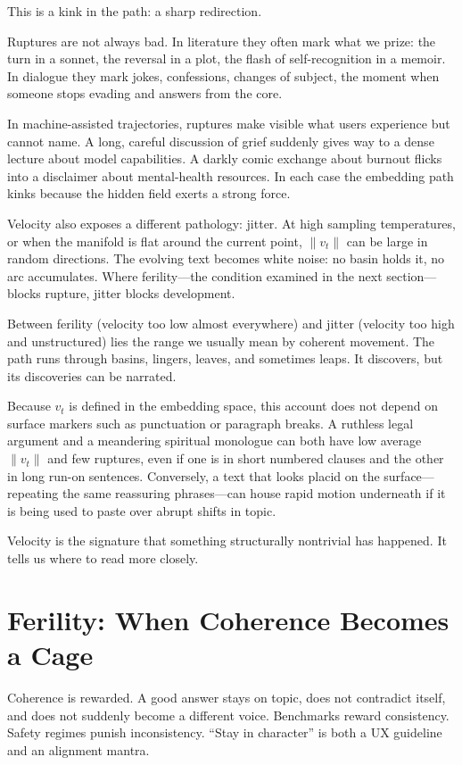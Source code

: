 \documentclass[12pt,a4paper]{article}
\begin{document}
This is a kink in the path: a sharp redirection.

Ruptures are not always bad. In literature they often mark what we prize: the turn in a sonnet, the reversal in a plot, the flash of self-recognition in a memoir. In dialogue they mark jokes, confessions, changes of subject, the moment when someone stops evading and answers from the core.

In machine-assisted trajectories, ruptures make visible what users experience but cannot name. A long, careful discussion of grief suddenly gives way to a dense lecture about model capabilities. A darkly comic exchange about burnout flicks into a disclaimer about mental-health resources. In each case the embedding path kinks because the hidden field exerts a strong force.

Velocity also exposes a different pathology: jitter. At high sampling temperatures, or when the manifold is flat around the current point, $\|v_t\|$ can be large in random directions. The evolving text becomes white noise: no basin holds it, no arc accumulates. Where ferility---the condition examined in the next section---blocks rupture, jitter blocks development.

Between ferility (velocity too low almost everywhere) and jitter (velocity too high and unstructured) lies the range we usually mean by coherent movement. The path runs through basins, lingers, leaves, and sometimes leaps. It discovers, but its discoveries can be narrated.

Because $v_t$ is defined in the embedding space, this account does not depend on surface markers such as punctuation or paragraph breaks. A ruthless legal argument and a meandering spiritual monologue can both have low average $\|v_t\|$ and few ruptures, even if one is in short numbered clauses and the other in long run-on sentences. Conversely, a text that looks placid on the surface---repeating the same reassuring phrases---can house rapid motion underneath if it is being used to paste over abrupt shifts in topic.

Velocity is the signature that something structurally nontrivial has happened. It tells us where to read more closely.

\section{Ferility: When Coherence Becomes a Cage}

Coherence is rewarded. A good answer stays on topic, does not contradict itself, and does not suddenly become a different voice. Benchmarks reward consistency. Safety regimes punish inconsistency. ``Stay in character'' is both a UX guideline and an alignment mantra.
\end{document}
